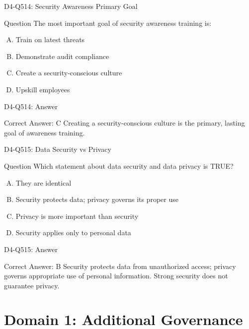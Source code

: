 \documentclass{beamer}
\begin{document}
\begin{frame}{D4-Q514: Security Awareness Primary Goal}
	\begin{block}{Question}
		The most important goal of security awareness training is:
	\end{block}
	\begin{enumerate}[(A)]
		\item Train on latest threats
		\item Demonstrate audit compliance
		\item Create a security-conscious culture
		\item Upskill employees
	\end{enumerate}
\end{frame}
\begin{frame}{D4-Q514: Answer}
	\begin{block}{Correct Answer: C}
		Creating a security-conscious culture is the primary, lasting goal of awareness training.
	\end{block}
\end{frame}

\begin{frame}{D4-Q515: Data Security vs Privacy}
	\begin{block}{Question}
		Which statement about data security and data privacy is TRUE?
	\end{block}
	\begin{enumerate}[(A)]
		\item They are identical
		\item Security protects data; privacy governs its proper use
		\item Privacy is more important than security
		\item Security applies only to personal data
	\end{enumerate}
\end{frame}
\begin{frame}{D4-Q515: Answer}
	\begin{block}{Correct Answer: B}
		Security protects data from unauthorized access; privacy governs appropriate use of personal information. Strong security does not guarantee privacy.
	\end{block}
\end{frame}


\section{Domain 1: Additional Governance}
\end{document}
